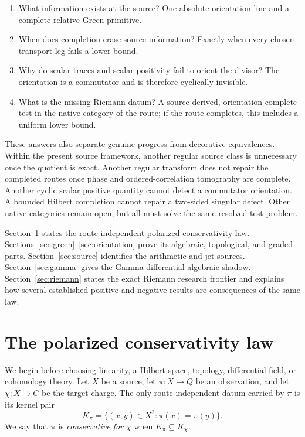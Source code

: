 \documentclass[11pt]{article}
\theoremstyle{definition}
\theoremstyle{remark}
\begin{document}
\begin{enumerate}[label=\textup{(\roman*)},leftmargin=2.2em]
\item What information exists at the source?  One absolute orientation line
      and a complete relative Green primitive.
\item When does completion erase source information?  Exactly when every
      chosen transport leg fails a lower bound.
\item Why do scalar traces and scalar positivity fail to orient the divisor?
      The orientation is a commutator and is therefore cyclically invisible.
\item What is the missing Riemann datum?  A source-derived,
      orientation-complete test in the native category of the route; if the
      route completes, this includes a uniform lower bound.
\end{enumerate}

These answers also separate genuine progress from decorative equivalences.
Within the present source framework, another regular source class is
unnecessary once the quotient is exact.  Another regular transform does not
repair the completed routes once phase and ordered-correlation tomography
are complete.  Another cyclic scalar positive quantity cannot detect a
commutator orientation.  A bounded Hilbert completion cannot repair a
two-sided singular defect.  Other native categories remain open, but all
must solve the same resolved-test problem.

Section~\ref{sec:law} states the route-independent polarized conservativity law.
Sections~\ref{sec:green}--\ref{sec:orientation} prove its algebraic,
topological, and graded parts.  Section~\ref{sec:source} identifies the
arithmetic and jet sources.  Section~\ref{sec:gamma} gives the Gamma
differential-algebraic shadow.  Section~\ref{sec:riemann} states the exact
Riemann research frontier and explains how several established positive and
negative results are consequences of the same law.

\section{The polarized conservativity law}
\label{sec:law}

We begin before choosing linearity, a Hilbert space, topology, differential
field, or cohomology theory.  Let \(X\) be a source, let \(\pi:X\to Q\) be
an observation, and let \(\chi:X\to C\) be the target charge.  The only
route-independent datum carried by \(\pi\) is its kernel pair
\[
       K_\pi=\{(x,y)\in X^2:\pi(x)=\pi(y)\}.
\tag{2.0}\label{eq:kernel-pair}
\]
We say that \(\pi\) is \emph{conservative for \(\chi\)} when
\(K_\pi\subseteq K_\chi\).
\end{document}
